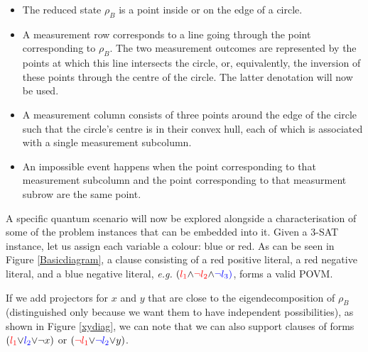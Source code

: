 \documentclass[reprint]{revtex4-1}
\theoremstyle{definition}
\begin{document}
\begin{itemize}
\item The reduced state $\rho_B$ is a point inside or on the edge of a circle.

\item A measurement row corresponds to a line going through the point corresponding to $\rho_B$. The two measurement outcomes are represented by the points at which this line intersects the circle, or, equivalently, the inversion of these points through the centre of the circle. The latter denotation will now be used.

\item A measurement column consists of three points around the edge of the circle such that the circle's centre is in their convex hull, each of which is associated with a single measurement subcolumn.

\item An impossible event happens when the point corresponding to that measurement subcolumn and the point corresponding to that measurment subrow are the same point. %
\end{itemize}

A specific quantum scenario will now be explored alongside a characterisation of some of the problem instances that can be embedded into it. Given a \textsc{3-SAT} instance, let us assign each variable a colour: blue or red. As can be seen in Figure \ref{Basicdiagram}, a clause consisting of a red positive literal, a red negative literal, and a blue negative literal, \emph{e.g.} $(\color{red}{l_1} \color{black}{\wedge} \color{red}{\neg l_2} \color{black}{\wedge} \color{blue}{\neg l_3})$, forms a valid POVM.

If we add projectors for $x$ and $y$ that are close to the eigendecomposition of $\rho_B$ (distinguished only because we want them to have independent possibilities), as shown in Figure \ref{xydiag}, we can note that we can also support clauses of forms $(\color{red}{l_1} \color{black}{\vee} \color{blue}{ l_2} \color{black}{\vee} \neg x)$ or $(\color{red}{\neg l_1} \color{black}{\vee} \color{blue}{\neg l_2} \color{black}{\vee} y)$.
\end{document}
